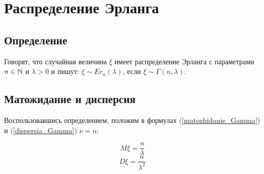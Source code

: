 \section{Распределение Эрланга}

\subsection{Определение}
Говорят, что случайная величина $\xi$ имеет распределение Эрланга с параметрами $n\in\mathbb{N}$ и $\lambda>0$ и пишут: $\xi \sim Er_n(\lambda)$, если $\xi \sim \Gamma(n,\lambda)$.

\subsection{Матожидание и дисперсия}
Воспользовавшись определением, положим в формулах (\ref{matozhidanie_Gamma}) и (\ref{dispersia_Gamma}) $\nu=n$:

\begin{equation}
M\xi = 
\frac{n}{\lambda }
\end{equation}
\begin{equation}
D\xi = 
\frac{n}{\lambda^2 }
\end{equation}

